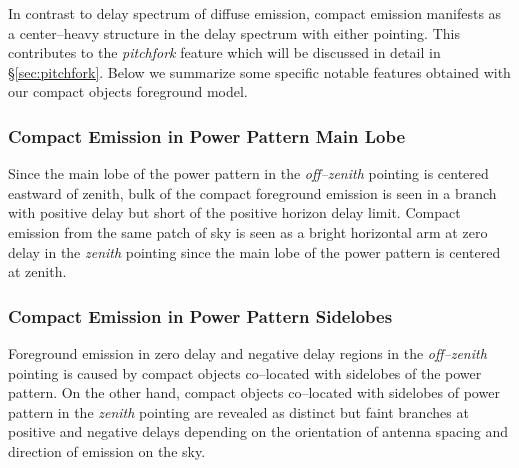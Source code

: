 \documentclass[preprint2,iop,numberedappendix]{emulateapj}
\begin{document}
In contrast to delay spectrum of diffuse emission, compact emission manifests as a center--heavy structure in the delay spectrum with either pointing. This contributes to the {\it pitchfork} feature which will be discussed in detail in \S\ref{sec:pitchfork}. Below we summarize some specific notable features obtained with our compact objects foreground model.

\subsubsection{Compact Emission in Power Pattern Main Lobe}\label{sec:csm-main-lobe}

Since the main lobe of the power pattern in the {\it off--zenith} pointing is centered eastward of zenith, bulk of the compact foreground emission is seen in a branch with positive delay but short of the positive horizon delay limit. Compact emission from the same patch of sky is seen as a bright horizontal arm at zero delay in the {\it zenith} pointing since the main lobe of the power pattern is centered at zenith. 

\subsubsection{Compact Emission in Power Pattern Sidelobes}\label{sec:csm-side-lobe}

Foreground emission in zero delay and negative delay regions in the {\it off--zenith} pointing is caused by compact objects co--located with sidelobes of the power pattern. On the other hand, compact objects co--located with sidelobes of power pattern in the {\it zenith} pointing are revealed as distinct but faint branches at positive and negative delays depending on the orientation of antenna spacing and direction of emission on the sky. 


\end{document}
